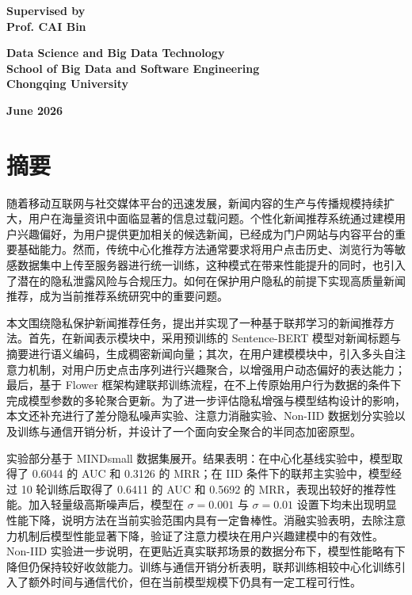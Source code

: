 \documentclass[UTF8,a4paper,12pt]{ctexart}
\numberwithin{equation}{section}
\begin{document}
\begin{center}
\textbf{Supervised by}\\
\textbf{Prof. CAI Bin}
\end{center}

\begin{center}
\textbf{Data Science and Big Data Technology}\\
\textbf{School of Big Data and Software Engineering}\\
\textbf{Chongqing University}
\end{center}

\begin{center}
\textbf{June 2026}
\end{center}

\newpage
\pagestyle{fancy}

\section*{摘\quad 要}
随着移动互联网与社交媒体平台的迅速发展，新闻内容的生产与传播规模持续扩大，用户在海量资讯中面临显著的信息过载问题。个性化新闻推荐系统通过建模用户兴趣偏好，为用户提供更加相关的候选新闻，已经成为门户网站与内容平台的重要基础能力。然而，传统中心化推荐方法通常要求将用户点击历史、浏览行为等敏感数据集中上传至服务器进行统一训练，这种模式在带来性能提升的同时，也引入了潜在的隐私泄露风险与合规压力。如何在保护用户隐私的前提下实现高质量新闻推荐，成为当前推荐系统研究中的重要问题。

本文围绕隐私保护新闻推荐任务，提出并实现了一种基于联邦学习的新闻推荐方法。首先，在新闻表示模块中，采用预训练的 Sentence-BERT 模型对新闻标题与摘要进行语义编码，生成稠密新闻向量；其次，在用户建模模块中，引入多头自注意力机制，对用户历史点击序列进行兴趣聚合，以增强用户动态偏好的表达能力；最后，基于 Flower 框架构建联邦训练流程，在不上传原始用户行为数据的条件下完成模型参数的多轮聚合更新。为了进一步评估隐私增强与模型结构设计的影响，本文还补充进行了差分隐私噪声实验、注意力消融实验、Non-IID 数据划分实验以及训练与通信开销分析，并设计了一个面向安全聚合的半同态加密原型。

实验部分基于 MINDsmall 数据集展开。结果表明：在中心化基线实验中，模型取得了 0.6044 的 AUC 和 0.3126 的 MRR；在 IID 条件下的联邦主实验中，模型经过 10 轮训练后取得了 0.6411 的 AUC 和 0.5692 的 MRR，表现出较好的推荐性能。加入轻量级高斯噪声后，模型在 $\sigma=0.001$ 与 $\sigma=0.01$ 设置下均未出现明显性能下降，说明方法在当前实验范围内具有一定鲁棒性。消融实验表明，去除注意力机制后模型性能显著下降，验证了注意力模块在用户兴趣建模中的有效性。Non-IID 实验进一步说明，在更贴近真实联邦场景的数据分布下，模型性能略有下降但仍保持较好收敛能力。训练与通信开销分析表明，联邦训练相较中心化训练引入了额外时间与通信代价，但在当前模型规模下仍具有一定工程可行性。
\end{document}
